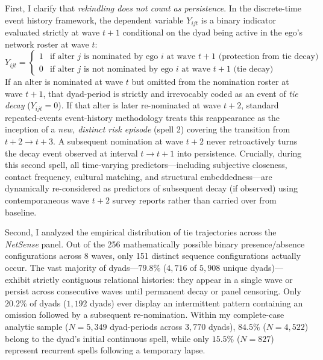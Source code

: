 \documentclass[11pt]{article}
\begin{document}
First, I clarify that \textit{rekindling does not count as persistence}. In the discrete-time event history framework, the dependent variable $Y_{ijt}$ is a binary indicator evaluated strictly at wave $t+1$ conditional on the dyad being active in the ego's network roster at wave $t$:
\begin{equation*}
Y_{ijt} = \begin{cases} 
1 & \text{if alter } j \text{ is nominated by ego } i \text{ at wave } t+1 \text{ (protection from tie decay)} \\ 
0 & \text{if alter } j \text{ is not nominated by ego } i \text{ at wave } t+1 \text{ (tie decay)} 
\end{cases}
\end{equation*}
If an alter is nominated at wave $t$ but omitted from the nomination roster at wave $t+1$, that dyad-period is strictly and irrevocably coded as an event of \textit{tie decay} ($Y_{ijt} = 0$). If that alter is later re-nominated at wave $t+2$, standard repeated-events event-history methodology treats this reappearance as the inception of a \textit{new, distinct risk episode} (spell 2) covering the transition from $t+2 \to t+3$. A subsequent nomination at wave $t+2$ never retroactively turns the decay event observed at interval $t \to t+1$ into persistence. Crucially, during this second spell, all time-varying predictors—including subjective closeness, contact frequency, cultural matching, and structural embeddedness—are dynamically re-considered as predictors of subsequent decay (if observed) using contemporaneous wave $t+2$ survey reports rather than carried over from baseline.

Second, I analyzed the empirical distribution of tie trajectories across the \textit{NetSense} panel. Out of the 256 mathematically possible binary presence/absence configurations across 8 waves, only 151 distinct sequence configurations actually occur. The vast majority of dyads—$79.8\%$ ($4,716$ of $5,908$ unique dyads)—exhibit strictly contiguous relational histories: they appear in a single wave or persist across consecutive waves until permanent decay or panel censoring. Only $20.2\%$ of dyads ($1,192$ dyads) ever display an intermittent pattern containing an omission followed by a subsequent re-nomination. Within my complete-case analytic sample ($N = 5,349$ dyad-periods across $3,770$ dyads), $84.5\%$ ($N = 4,522$) belong to the dyad's initial continuous spell, while only $15.5\%$ ($N = 827$) represent recurrent spells following a temporary lapse.
\end{document}
